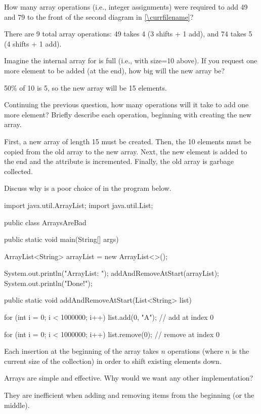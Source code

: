 \Q \label{arrayopers}
How many array operations (i.e., integer assignments) were required to add 49 and 79 to the front of the second diagram in \ref{\currfilename}?

\begin{answer}
There are 9 total array operations:
49 takes 4 (3 shifts + 1 add), and 74 takes 5 (4 shifts + 1 add).
\end{answer}


\Q Imagine the internal array for  is full (i.e., with size=10 above).
If you request one more element to be added (at the end), how big will the new array be?

\begin{answer}
50\% of 10 is 5, so the new array will be 15 elements.
\end{answer}


\Q Continuing the previous question, how many operations will it take to add one more element? Briefly describe each operation, beginning with creating the new array.

\begin{answer}
First, a new array of length 15 must be created.
Then, the 10 elements must be copied from the old array to the new array.
Next, the new element is added to the end and the  attribute is incremented.
Finally, the old array is garbage collected.
\end{answer}


\Q \label{ArraysAreBad}
Discuss why  is a poor choice of  in the program below.

\vspace{1ex}
\begin{javabox}
import java.util.ArrayList;
import java.util.List;

public class ArraysAreBad
{
    public static void main(String[] args)
    {
        ArrayList<String> arrayList = new ArrayList<>();

        System.out.println("ArrayList: ");
        addAndRemoveAtStart(arrayList);
        System.out.println("Done!");
    }

    public static void addAndRemoveAtStart(List<String> list)
    {
        for (int i = 0; i < 1000000; i++)
        {
            list.add(0, "A");  // add at index 0
        }

        for (int i = 0; i < 1000000; i++)
        {
            list.remove(0);  // remove at index 0
        }
    }
}
\end{javabox}
\vspace{-1ex}

\begin{answer}[3em]
Each insertion at the beginning of the array takes $n$ operations (where $n$ is the current size of the collection) in order to shift existing elements down.
\end{answer}


\Q Arrays are simple and effective. Why would we want any other implementation?

\begin{answer}[3em]
They are inefficient when adding and removing items from the beginning (or the middle).
\end{answer}
